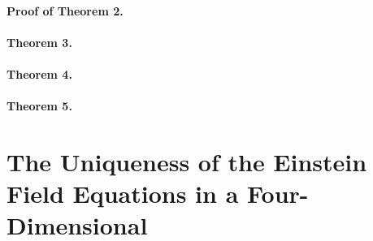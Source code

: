 \documentclass[12pt, a4paper]{jsarticle}
\begin{document}
\subsection{Proof of Theorem 2.}

\subsection{Theorem 3.}

\subsection{Theorem 4.}

\subsection{Theorem 5.}

\part{The Uniqueness of the Einstein Field Equations in a Four-Dimensional}

\begin{thebibliography}{9}
\end{thebibliography}
\end{document}
